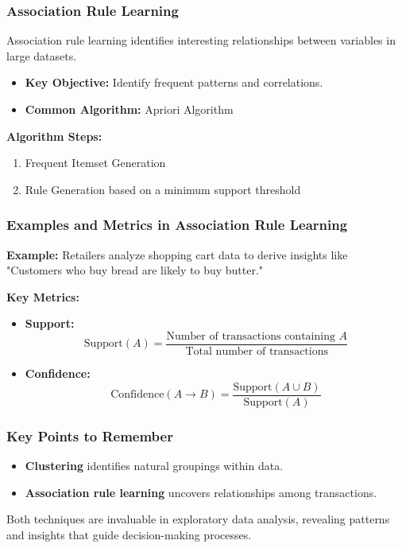 \documentclass[aspectratio=169]{beamer}
\begin{document}
\begin{frame}[fragile]
    \frametitle{Association Rule Learning}
    Association rule learning identifies interesting relationships between variables in large datasets.

    \begin{itemize}
        \item \textbf{Key Objective:} Identify frequent patterns and correlations.
        \item \textbf{Common Algorithm:} Apriori Algorithm
    \end{itemize}
    
    \textbf{Algorithm Steps:}
    \begin{enumerate}
        \item Frequent Itemset Generation
        \item Rule Generation based on a minimum support threshold
    \end{enumerate}
\end{frame}

\begin{frame}[fragile]
    \frametitle{Examples and Metrics in Association Rule Learning}
    \textbf{Example:} Retailers analyze shopping cart data to derive insights like "Customers who buy bread are likely to buy butter."

    \textbf{Key Metrics:}
    \begin{itemize}
        \item \textbf{Support:}
        \begin{equation}
            \text{Support}(A) = \frac{\text{Number of transactions containing } A}{\text{Total number of transactions}}
        \end{equation}
        \item \textbf{Confidence:}
        \begin{equation}
            \text{Confidence}(A \rightarrow B) = \frac{\text{Support}(A \cup B)}{\text{Support}(A)}
        \end{equation}
    \end{itemize}
\end{frame}

\begin{frame}[fragile]
    \frametitle{Key Points to Remember}
    \begin{itemize}
        \item \textbf{Clustering} identifies natural groupings within data.
        \item \textbf{Association rule learning} uncovers relationships among transactions.
    \end{itemize}
    
    Both techniques are invaluable in exploratory data analysis, revealing patterns and insights that guide decision-making processes.
\end{frame}
\end{document}
